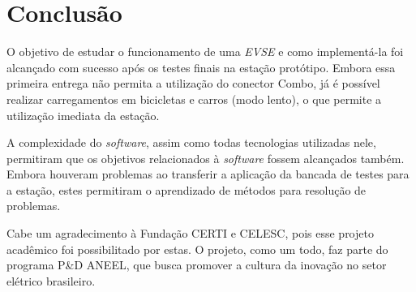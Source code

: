 \chapter{Conclusão}
\label{stateofart:conclusion}

  O objetivo de estudar o funcionamento de uma \textit{\ac{EVSE}} e como implementá-la foi alcançado com sucesso após os testes finais na estação protótipo. Embora essa primeira entrega não permita a utilização do conector Combo, já é possível realizar carregamentos em bicicletas e carros (modo lento), o que permite a utilização imediata da estação.


  A complexidade do \textit{software}, assim como todas tecnologias utilizadas nele, permitiram que os objetivos relacionados à \textit{software} fossem alcançados também. Embora houveram problemas ao transferir a aplicação da bancada de testes para a estação, estes permitiram o aprendizado de métodos para resolução de problemas.

  Cabe um agradecimento à Fundação CERTI e CELESC, pois esse projeto acadêmico foi possibilitado por estas. O projeto, como um todo, faz parte do programa P\&D ANEEL, que busca promover a cultura da inovação no setor elétrico brasileiro.
  